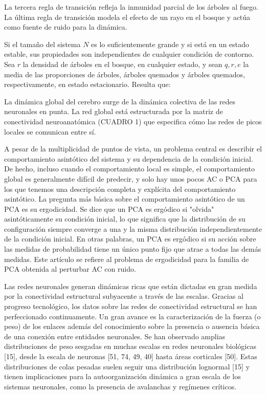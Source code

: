 La tercera regla de transición refleja la inmunidad parcial de los árboles al fuego. La última regla de transición modela el efecto de un rayo en el bosque y actúa como fuente de ruido para la dinámica.

Si el tamaño del sistema $N$ es lo suficientemente grande y si está en un estado estable, sus propiedades son independientes de cualquier condición de contorno. Sea $r$ la densidad de árboles en el bosque, en cualquier estado, y sean $q, r, e$ la media de las proporciones de árboles, árboles quemados y árboles quemados, respectivamente, en estado estacionario. Resulta que:

La dinámica global del cerebro surge de la dinámica colectiva de las redes neuronales en punta. La red global está estructurada por la matriz de conectividad neuroanatómica (CUADRO 1) que especifica cómo las redes de picos locales se comunican entre sí.



A pesar de la multiplicidad de puntos de vista, un problema central es describir el comportamiento asintótico del sistema y su dependencia de la condición inicial. De hecho, incluso cuando el comportamiento local es simple, el comportamiento global es generalmente difícil de predecir, y solo hay unos pocos AC o PCA para los que tenemos una descripción completa y explícita del comportamiento asintótico.
La pregunta más básica sobre el comportamiento asintótico de un PCA es su ergodicidad. Se dice que un PCA es ergódico si "olvida" asintóticamente su condición inicial, lo que significa que la distribución de su configuración siempre converge a una y la misma distribución independientemente de la condición inicial. En otras palabras, un PCA es ergódico si su acción sobre las medidas de probabilidad tiene un único punto fijo que atrae a todas las demás medidas. Este artículo se refiere al problema de ergodicidad para la familia de PCA obtenida al perturbar AC con ruido.




Las redes neuronales generan dinámicas ricas que están dictadas en gran medida por la conectividad estructural subyacente a través de las escalas. Gracias al progreso tecnológico, los datos sobre las redes de conectividad estructural se han perfeccionado continuamente. Un gran avance es la caracterización de la fuerza (o peso) de los enlaces además del conocimiento sobre la presencia o ausencia básica de una conexión entre entidades neuronales.  Se han observado amplias distribuciones de peso sesgadas en muchas escalas en redes neuronales biológicas [15], desde la escala de neuronas [51, 74, 49, 40] hasta áreas corticales [50]. Estas distribuciones de colas pesadas suelen seguir una distribución lognormal [15] y tienen implicaciones para la autoorganización dinámica a gran escala de los sistemas neuronales, como la presencia de avalanchas y regímenes críticos. 



